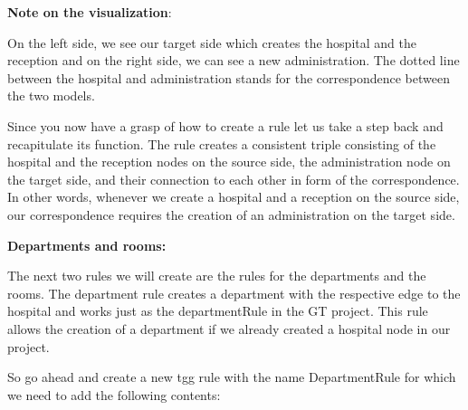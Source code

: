 \textbf{Note on the visualization}:

On the left side, we see our target side which creates the hospital and the reception and on the right side, we can see a new administration. The dotted line between the hospital and administration stands for the correspondence between the two models.\newline

Since you now have a grasp of how to create a rule let us take a step back and recapitulate its function. The rule creates a consistent triple consisting of the hospital and the reception nodes on the source side, the administration node on the target side, and their connection to each other in form of the correspondence. In other words, whenever we create a hospital and a reception on the source side, our correspondence requires the creation of an administration on the target side.

\clearpage

\textbf{Departments and rooms:}

The next two rules we will create are the rules for the departments and the rooms. 
The department rule creates a department with the respective edge to the hospital and works just as the departmentRule in the GT project. This rule allows the creation of a department if we already created a hospital node in our project. 

So go ahead and create a new tgg rule with the name \textsf{DepartmentRule} for which we need to add the following contents:\newline

